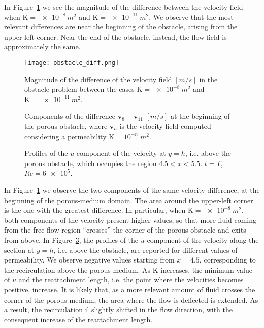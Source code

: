 In Figure~\ref{fig:obstacle_diff} we see the magnitude of the difference between the velocity field when $\mathrm{K}=\SI{e-8}{m^2}$ and $\mathrm{K}=\SI{e-11}{m^2}$. We observe that the most relevant differences are near the beginning of the obstacle, arising from the upper-left corner. Near the end of the obstacle, instead, the flow field is approximately the same.
\begin{figure}
	\centering
	\texttt{[image: obstacle\_diff.png]}
	\caption[Magnitude of the difference of the velocity field in the obstacle problem considering two values of permeability]{Magnitude of the difference of the velocity field $[\si{m/s}]$ in the obstacle problem between the cases $\mathrm{K}=\SI{e-8}{m^2}$ and $\mathrm{K}=\SI{e-11}{m^2}$.}
	\label{fig:obstacle_diff}
\end{figure}
\begin{figure}
	\centering
	\hspace{2cm}
	\caption[Difference of the velocity field at the beginning of the porous obstacle between two values of permeability]{Components of the difference $\mathbf{v}_8 - \mathbf{v}_{11}$ $[\si{m/s}]$ at the beginning of the porous obstacle, where $\mathbf{v}_n$ is the velocity field computed considering a permeability $\mathrm{K}=10^{-n}\;\si{m^2}$.}
	\label{fig:obstacle_pm_diff}
\end{figure}
\begin{figure}
	\centering
	
	\caption[Profiles of the $u$ component of the velocity above the porous obstacle]{Profiles of the $u$ component of the velocity at $y=h$, i.e. above the porous obstacle, which occupies the region $4.5 < x < 5.5$. $t=T$, $Re=\num{6e5}$.}
	\label{fig:obstacle_velx}
\end{figure}
In Figure~\ref{fig:obstacle_diff} we observe the two components of the same velocity difference, at the beginning of the porous-medium domain. The area around the upper-left corner is the one with the greatest difference. In particular, when $\mathrm{K} = \SI{e-8}{m^2}$, both components of the velocity present higher values, so that more fluid coming from the free-flow region ``crosses'' the corner of the porous obstacle and exits from above.
In Figure~\ref{fig:obstacle_velx}, the profiles of the $u$ component of the velocity along the section at $y=h$, i.e. above the obstacle, are reported for different values of permeability. We observe negative values starting from $x=4.5$, corresponding to the recirculation above the porous-medium. As $\mathrm{K}$ increases, the minimum value of $u$ and the reattachment length, i.e. the point where the velocities becomes positive, increase. It is likely that, as a more relevant amount of fluid crosses the corner of the porous-medium, the area where the flow is deflected is extended. As a result, the recirculation il slightly shifted in the flow direction, with the consequent increase of the reattachment length.
